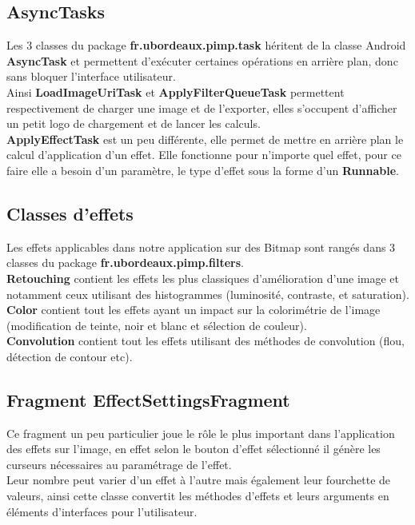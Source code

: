 \subsection{AsyncTasks}
Les 3 classes du package \textbf{fr.ubordeaux.pimp.task} héritent de la classe Android \textbf{AsyncTask} et permettent d'exécuter certaines opérations en arrière plan, donc sans bloquer l'interface utilisateur.
\\
Ainsi \textbf{LoadImageUriTask} et \textbf{ApplyFilterQueueTask} permettent respectivement de charger une image et de l'exporter, elles s'occupent d'afficher un petit logo de chargement et de lancer les calculs.
\\
\textbf{ApplyEffectTask} est un peu différente, elle permet de mettre en arrière plan le calcul d'application d'un effet. Elle fonctionne pour n'importe quel effet, pour ce faire elle a besoin d'un paramètre, le type d'effet sous la forme d'un \textbf{Runnable}.

\subsection{Classes d'effets}
Les effets applicables dans notre application sur des Bitmap sont rangés dans 3 classes du package \textbf{fr.ubordeaux.pimp.filters}.
\\
\textbf{Retouching} contient les effets les plus classiques d'amélioration d'une image et notamment ceux utilisant des histogrammes (luminosité, contraste, et saturation).
\\
\textbf{Color} contient tout les effets ayant un impact sur la colorimétrie de l'image (modification de teinte, noir et blanc et sélection de couleur).
\\
\textbf{Convolution} contient tout les effets utilisant des méthodes de convolution (flou, détection de contour etc).
\\

\subsection{Fragment \textbf{EffectSettingsFragment}} \label{effect_settings}
Ce fragment un peu particulier joue le rôle le plus important dans l'application des effets sur l'image, en effet selon le bouton d'effet sélectionné il génère les curseurs nécessaires au paramétrage de l'effet.
\\
Leur nombre peut varier d'un effet à l'autre mais également leur fourchette de valeurs, ainsi cette classe convertit les méthodes d'effets et leurs arguments en éléments d'interfaces pour l'utilisateur.

